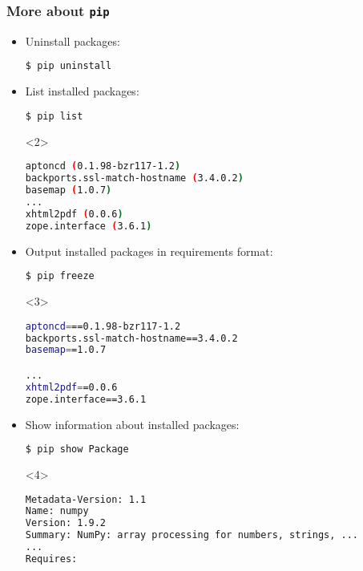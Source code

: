 \begin{frame}[t, fragile]
\frametitle{More about \texttt{pip}}


\begin{itemize}
\item<1-> Uninstall packages:                   
\begin{lstlisting}[language=bash]
$ pip uninstall
\end{lstlisting}
\item<2->List installed packages:
\begin{lstlisting}[language=bash]
$ pip list
\end{lstlisting}

\begin{onlyenv}<2>
\tiny
\begin{lstlisting}[language=bash]
aptoncd (0.1.98-bzr117-1.2)
backports.ssl-match-hostname (3.4.0.2)
basemap (1.0.7)
...
xhtml2pdf (0.0.6)
zope.interface (3.6.1)
\end{lstlisting}
\end{onlyenv}


\item<3-> Output installed packages in requirements format:
\begin{lstlisting}[language=bash]
$ pip freeze
\end{lstlisting}

\begin{onlyenv}<3>
\tiny
\begin{lstlisting}[language=bash]
aptoncd===0.1.98-bzr117-1.2
backports.ssl-match-hostname==3.4.0.2
basemap==1.0.7

...
xhtml2pdf==0.0.6
zope.interface==3.6.1
\end{lstlisting}
\end{onlyenv}

\item<4-> Show information about installed packages:
\begin{lstlisting}[language=bash]
$ pip show Package
\end{lstlisting}

\begin{onlyenv}<4>
\tiny
\begin{lstlisting}[language=bash]
Metadata-Version: 1.1
Name: numpy
Version: 1.9.2
Summary: NumPy: array processing for numbers, strings, ...
...
Requires:
\end{lstlisting}
\end{onlyenv}

\end{itemize}

\end{frame}

